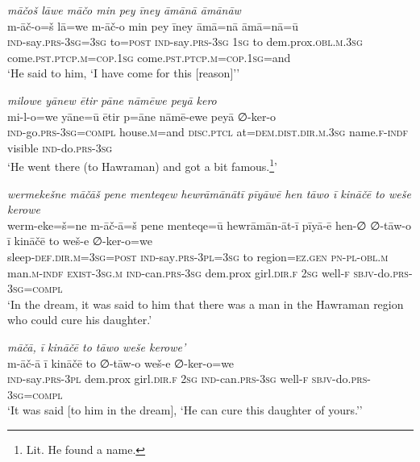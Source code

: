 \ea \label{ŽP.138}
\textit{māčoš lāwe māčo min pey īney āmānā āmānāw} \\ 
\gll m-āč-o=š lā=we m-āč-o min pey īney āmā=nā āmā=nā=ū \\ 
 \textsc{ind-}say\textsc{.prs}\textsc{-3sg}\textsc{=3sg} to\textsc{=\textsc{post}} \textsc{ind-}say\textsc{.prs}\textsc{-3sg} \textsc{1sg} to dem.prox\textsc{.obl}\textsc{.m}\textsc{.3sg} come\textsc{.pst}\textsc{.ptcp}\textsc{.m}\textsc{=cop}\textsc{.\textsc{1sg}} come\textsc{.pst}\textsc{.ptcp}\textsc{.m}\textsc{=cop}\textsc{.\textsc{1sg}}=and \\ 
\glt `He said to him, ‘I have come for this [reason]’'
\z 
 
\ea \label{ŽP.143}
\textit{milowe yānew ētir pāne nāmēwe peyā kero} \\ 
\gll mi-l-o=we yāne=ū ētir p=āne nāmē-ewe peyā ∅-ker-o \\ 
 \textsc{ind-}go\textsc{.prs}\textsc{-3sg}\textsc{=compl} house\textsc{.m}=and \textsc{disc.ptcl} at=\textsc{dem.dist}\textsc{.dir}\textsc{.m}\textsc{.3sg} name\textsc{.f}\textsc{-indf} visible \textsc{ind-}do\textsc{.prs}\textsc{-3sg} \\ 
\glt `He went there (to Hawraman) and got a bit famous.\footnote{Lit. He found a name.}'
\z 
 
\ea \label{ŽP.154}
\textit{wermekešne māčāš pene menteqew hewrāmānātī pīyāwē hen tāwo ī kināčē to weše kerowe} \\ 
\gll werm-eke=š=ne m-āč-ā=š pene menteqe=ū hewrāmān-āt-ī pīyā-ē hen-∅ ∅-tāw-o ī kināčē to weš-e ∅-ker-o=we \\ 
 sleep\textsc{-def}\textsc{.dir}\textsc{.m}\textsc{=3sg}\textsc{=\textsc{post}} \textsc{ind-}say\textsc{.prs}\textsc{-3pl}\textsc{=3sg} to region=\textsc{ez.gen} \textsc{pn}\textsc{\textsc{-pl}}\textsc{-obl}\textsc{.m} man\textsc{.m}\textsc{-indf} \textsc{exist}\textsc{-3sg}\textsc{.m} \textsc{ind-}can\textsc{.prs}\textsc{-3sg} dem.prox girl\textsc{.dir}\textsc{.f} \textsc{2sg} well\textsc{-f} \textsc{sbjv-}do\textsc{.prs}\textsc{-3sg}\textsc{=compl} \\ 
\glt `In the dream, it was said to him that there was a man in the Hawraman region who could cure his daughter.'
\z 
 
\ea \label{ŽP.156}
\textit{māčā, ī kināčē to tāwo weše kerowe’} \\ 
\gll m-āč-ā ī kināčē to ∅-tāw-o weš-e ∅-ker-o=we \\ 
 \textsc{ind-}say\textsc{.prs}\textsc{-3pl} dem.prox girl\textsc{.dir}\textsc{.f} \textsc{2sg} \textsc{ind-}can\textsc{.prs}\textsc{-3sg} well\textsc{-f} \textsc{sbjv-}do\textsc{.prs}\textsc{-3sg}\textsc{=compl} \\ 
\glt `It was said [to him in the dream], ‘He can cure this daughter of yours.’'
\z 
 
